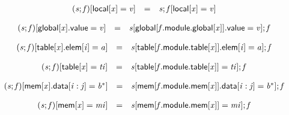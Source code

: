 \vspace{1ex}

$$
\begin{array}{@{}lcl@{}l@{}}
({\mathit{s}} ; {\mathit{f}})[\mathsf{local}[{\mathit{x}}] = {\mathit{v}}] &=& {\mathit{s}} ; {\mathit{f}}[\mathsf{local}[{\mathit{x}}] = {\mathit{v}}] &  \\
\end{array}
$$

$$
\begin{array}{@{}lcl@{}l@{}}
({\mathit{s}} ; {\mathit{f}})[\mathsf{global}[{\mathit{x}}].\mathsf{value} = {\mathit{v}}] &=& {\mathit{s}}[\mathsf{global}[{\mathit{f}}.\mathsf{module}.\mathsf{global}[{\mathit{x}}]].\mathsf{value} = {\mathit{v}}] ; {\mathit{f}} &  \\
\end{array}
$$

$$
\begin{array}{@{}lcl@{}l@{}}
({\mathit{s}} ; {\mathit{f}})[\mathsf{table}[{\mathit{x}}].\mathsf{elem}[{\mathit{i}}] = {\mathit{a}}] &=& {\mathit{s}}[\mathsf{table}[{\mathit{f}}.\mathsf{module}.\mathsf{table}[{\mathit{x}}]].\mathsf{elem}[{\mathit{i}}] = {\mathit{a}}] ; {\mathit{f}} &  \\
\end{array}
$$

$$
\begin{array}{@{}lcl@{}l@{}}
({\mathit{s}} ; {\mathit{f}})[\mathsf{table}[{\mathit{x}}] = {\mathit{ti}}] &=& {\mathit{s}}[\mathsf{table}[{\mathit{f}}.\mathsf{module}.\mathsf{table}[{\mathit{x}}]] = {\mathit{ti}}] ; {\mathit{f}} &  \\
\end{array}
$$

$$
\begin{array}{@{}lcl@{}l@{}}
({\mathit{s}} ; {\mathit{f}})[\mathsf{mem}[{\mathit{x}}].\mathsf{data}[{\mathit{i}} : {\mathit{j}}] = {{\mathit{b}}^\ast}] &=& {\mathit{s}}[\mathsf{mem}[{\mathit{f}}.\mathsf{module}.\mathsf{mem}[{\mathit{x}}]].\mathsf{data}[{\mathit{i}} : {\mathit{j}}] = {{\mathit{b}}^\ast}] ; {\mathit{f}} &  \\
\end{array}
$$

$$
\begin{array}{@{}lcl@{}l@{}}
({\mathit{s}} ; {\mathit{f}})[\mathsf{mem}[{\mathit{x}}] = {\mathit{mi}}] &=& {\mathit{s}}[\mathsf{mem}[{\mathit{f}}.\mathsf{module}.\mathsf{mem}[{\mathit{x}}]] = {\mathit{mi}}] ; {\mathit{f}} &  \\
\end{array}
$$

